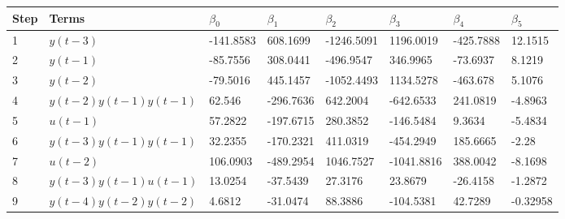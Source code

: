 \begin{tabular}{llllllll}
Step & Terms & $\beta_{0}$ & $\beta_{1}$ & $\beta_{2}$ & $\beta_{3}$ & $\beta_{4}$ & $\beta_{5}$ \\ 
\hline 
1 & $y(t-3)$ & -141.8583 & 608.1699 & -1246.5091 & 1196.0019 & -425.7888 & 12.1515 \\ 
2 & $y(t-1)$ & -85.7556 & 308.0441 & -496.9547 & 346.9965 & -73.6937 & 8.1219 \\ 
3 & $y(t-2)$ & -79.5016 & 445.1457 & -1052.4493 & 1134.5278 & -463.678 & 5.1076 \\ 
4 & $y(t-2)y(t-1)y(t-1)$ & 62.546 & -296.7636 & 642.2004 & -642.6533 & 241.0819 & -4.8963 \\ 
5 & $u(t-1)$ & 57.2822 & -197.6715 & 280.3852 & -146.5484 & 9.3634 & -5.4834 \\ 
6 & $y(t-3)y(t-1)y(t-1)$ & 32.2355 & -170.2321 & 411.0319 & -454.2949 & 185.6665 & -2.28 \\ 
7 & $u(t-2)$ & 106.0903 & -489.2954 & 1046.7527 & -1041.8816 & 388.0042 & -8.1698 \\ 
8 & $y(t-3)y(t-1)u(t-1)$ & 13.0254 & -37.5439 & 27.3176 & 23.8679 & -26.4158 & -1.2872 \\ 
9 & $y(t-4)y(t-2)y(t-2)$ & 4.6812 & -31.0474 & 88.3886 & -104.5381 & 42.7289 & -0.32958 \\ 
\hline 
\end{tabular}